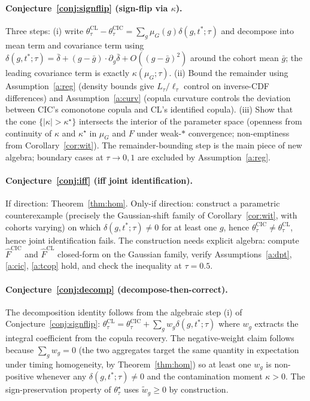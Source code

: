 \documentclass[11pt]{article}
\theoremstyle{definition}
\theoremstyle{plain}
\theoremstyle{remark}
\begin{document}
\paragraph{Conjecture~\ref{conj:signflip} (sign-flip via $\kappa$).} Three steps: (i) write $\theta^{\mathrm{CL}}_\tau - \theta^{\mathrm{CIC}}_\tau = \sum_g \mu_G(g) \delta(g, t^*; \tau)$ and decompose into mean term and covariance term using $\delta(g,t^*;\tau) = \bar\delta + (g - \bar g) \cdot \partial_g \bar\delta + O((g - \bar g)^2)$ around the cohort mean $\bar g$; the leading covariance term is exactly $\kappa(\mu_G;\tau)$. (ii) Bound the remainder using Assumption~\ref{a:reg} (density bounds give $L_\tau/\ell_\tau$ control on inverse-CDF differences) and Assumption~\ref{a:curv} (copula curvature controls the deviation between CIC's comonotone copula and CL's identified copula). (iii) Show that the cone $\{|\kappa| > \kappa^\star\}$ intersects the interior of the parameter space (openness from continuity of $\kappa$ and $\kappa^\star$ in $\mu_G$ and $F$ under weak-$*$ convergence; non-emptiness from Corollary~\ref{cor:wit}). The remainder-bounding step is the main piece of new algebra; boundary cases at $\tau \to 0, 1$ are excluded by Assumption~\ref{a:reg}.

\paragraph{Conjecture~\ref{conj:iff} (iff joint identification).} If direction: Theorem~\ref{thm:hom}. Only-if direction: construct a parametric counterexample (precisely the Gaussian-shift family of Corollary~\ref{cor:wit}, with cohorts varying) on which $\delta(g, t^*; \tau) \ne 0$ for at least one $g$, hence $\theta^{\mathrm{CIC}}_\tau \ne \theta^{\mathrm{CL}}_\tau$, hence joint identification fails. The construction needs explicit algebra: compute $\widehat{F}^{\mathrm{CIC}}$ and $\widehat{F}^{\mathrm{CL}}$ closed-form on the Gaussian family, verify Assumptions~\ref{a:dpt}, \ref{a:cic}, \ref{a:tcop} hold, and check the inequality at $\tau = 0.5$.

\paragraph{Conjecture~\ref{conj:decomp} (decompose-then-correct).} The decomposition identity follows from the algebraic step (i) of Conjecture~\ref{conj:signflip}: $\theta^{\mathrm{CL}}_\tau = \theta^{\mathrm{CIC}}_\tau + \sum_g w_g \delta(g, t^*; \tau)$ where $w_g$ extracts the integral coefficient from the copula recovery. The negative-weight claim follows because $\sum_g w_g = 0$ (the two aggregates target the same quantity in expectation under timing homogeneity, by Theorem~\ref{thm:hom}) so at least one $w_g$ is non-positive whenever any $\delta(g, t^*; \tau) \ne 0$ and the contamination moment $\kappa > 0$. The sign-preservation property of $\theta^\star_\tau$ uses $\tilde w_g \ge 0$ by construction.
\end{document}
